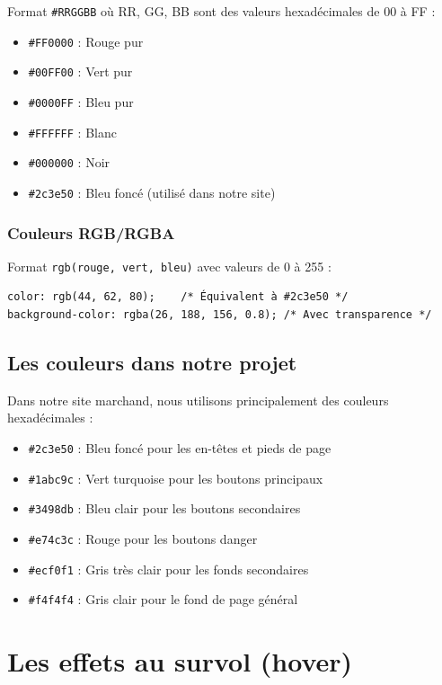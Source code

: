 \documentclass[12pt,a4paper]{article}
\begin{document}
Format \texttt{\#RRGGBB} où RR, GG, BB sont des valeurs hexadécimales de 00 à FF :

\begin{itemize}
\item \texttt{\#FF0000} : Rouge pur
\item \texttt{\#00FF00} : Vert pur
\item \texttt{\#0000FF} : Bleu pur
\item \texttt{\#FFFFFF} : Blanc
\item \texttt{\#000000} : Noir
\item \texttt{\#2c3e50} : Bleu foncé (utilisé dans notre site)
\end{itemize}

\subsubsection{Couleurs RGB/RGBA}

Format \texttt{rgb(rouge, vert, bleu)} avec valeurs de 0 à 255 :

\begin{lstlisting}
color: rgb(44, 62, 80);    /* Équivalent à #2c3e50 */
background-color: rgba(26, 188, 156, 0.8); /* Avec transparence */
\end{lstlisting}

\subsection{Les couleurs dans notre projet}

Dans notre site marchand, nous utilisons principalement des couleurs hexadécimales :

\begin{itemize}
\item \texttt{\#2c3e50} : Bleu foncé pour les en-têtes et pieds de page
\item \texttt{\#1abc9c} : Vert turquoise pour les boutons principaux
\item \texttt{\#3498db} : Bleu clair pour les boutons secondaires
\item \texttt{\#e74c3c} : Rouge pour les boutons danger
\item \texttt{\#ecf0f1} : Gris très clair pour les fonds secondaires
\item \texttt{\#f4f4f4} : Gris clair pour le fond de page général
\end{itemize}

\section{Les effets au survol (hover)}
\end{document}
